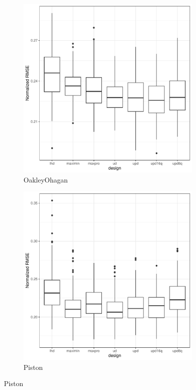 \documentclass [PhD] {package/uclathes}
\begin{document}
\begin{figure}
\begin{adjustwidth}{-2cm}{-2cm}
\begin{subfigure}[b]{0.35\textwidth}
\end{subfigure}
\begin{subfigure}[b]{0.35\textwidth}
\centering
\caption{OakleyOhagan}
\includegraphics[width=\textwidth]{chapters/EGO/pdfs/OakleyOhagan_64x15}
\end{subfigure}
\begin{subfigure}[b]{0.35\textwidth}
\centering
\caption{Piston}
\includegraphics[width=\textwidth]{chapters/EGO/pdfs/Piston_64x15}

\end{subfigure}
\end{adjustwidth}
\end{figure}
\end{document}
